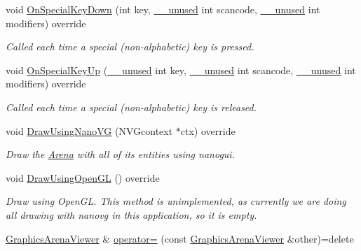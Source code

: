 \begin{DoxyCompactItemize}
void \hyperlink{classGraphicsArenaViewer_ab6ed6287ddf72f43f605482ce77b01a2}{On\+Special\+Key\+Down} (int key, \hyperlink{common_8h_a2e3484535ee610c8e19e9859563abe48}{\+\_\+\+\_\+unused} int scancode, \hyperlink{common_8h_a2e3484535ee610c8e19e9859563abe48}{\+\_\+\+\_\+unused} int modifiers) override
\begin{DoxyCompactList}\small\item\em Called each time a special (non-\/alphabetic) key is pressed. \end{DoxyCompactList}\item 
void \hyperlink{classGraphicsArenaViewer_a086e2e29e1a5745a8ee4f12996897b22}{On\+Special\+Key\+Up} (\hyperlink{common_8h_a2e3484535ee610c8e19e9859563abe48}{\+\_\+\+\_\+unused} int key, \hyperlink{common_8h_a2e3484535ee610c8e19e9859563abe48}{\+\_\+\+\_\+unused} int scancode, \hyperlink{common_8h_a2e3484535ee610c8e19e9859563abe48}{\+\_\+\+\_\+unused} int modifiers) override
\begin{DoxyCompactList}\small\item\em Called each time a special (non-\/alphabetic) key is released. \end{DoxyCompactList}\item 
void \hyperlink{classGraphicsArenaViewer_a7d59755e3f7674f382127fe135492eeb}{Draw\+Using\+Nano\+VG} (N\+V\+Gcontext $\ast$ctx) override
\begin{DoxyCompactList}\small\item\em Draw the \hyperlink{classArena}{Arena} with all of its entities using {\ttfamily nanogui}. \end{DoxyCompactList}\item 
void \hyperlink{classGraphicsArenaViewer_af894508bfa039199c6ff7f1b5a7da158}{Draw\+Using\+Open\+GL} () override\hypertarget{classGraphicsArenaViewer_af894508bfa039199c6ff7f1b5a7da158}{}\label{classGraphicsArenaViewer_af894508bfa039199c6ff7f1b5a7da158}

\begin{DoxyCompactList}\small\item\em Draw using {\ttfamily Open\+GL}. This method is unimplemented, as currently we are doing all drawing with {\ttfamily nanovg} in this application, so it is empty. \end{DoxyCompactList}\item 
\hyperlink{classGraphicsArenaViewer}{Graphics\+Arena\+Viewer} \& \hyperlink{classGraphicsArenaViewer_a289278f7b338fc60f983827d21b159ff}{operator=} (const \hyperlink{classGraphicsArenaViewer}{Graphics\+Arena\+Viewer} \&other)=delete\hypertarget{classGraphicsArenaViewer_a289278f7b338fc60f983827d21b159ff}{}\label{classGraphicsArenaViewer_a289278f7b338fc60f983827d21b159ff}


\end{DoxyCompactItemize}
